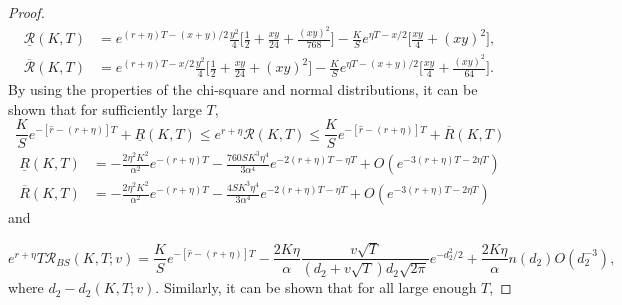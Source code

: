 \documentclass[a4 paper, 12pt]{report}
\theoremstyle{plain}
\begin{document}
\begin{proof}
\begin{align*}
\underline{\mathcal{R}}(K,T)& = e^{(r+\eta)T -(x+y)/2}\frac{y^2}{4}\bigg[\frac{1}{2}+\frac{xy}{24}+\frac{(xy)^2}{768}\bigg] - \frac{K}{S}e^{\eta T - x/2}\bigg[\frac{xy}{4}+(xy)^2\bigg],\\
\overline{\mathcal{R}}(K,T)& = e^{(r+\eta)T -x/2}\frac{y^2}{4}\bigg[\frac{1}{2}+\frac{xy}{24}+(xy)^2\bigg] - \frac{K}{S}e^{\eta T - (x+y)/2}\bigg[\frac{xy}{4}+\frac{(xy)^2}{64}\bigg].
\end{align*}
By using the properties of the chi-square and normal distributions, it can be shown that for
sufficiently large $T$,
\begin{equation}\label{38}
\frac{K}{S}e^{-[\hat{r} - (r+\eta)]T}+\underline{R}(K,T)\leq e^{r+\eta}\mathcal{R}(K,T)\leq \frac{K}{S}e^{-[\hat{r} - (r+\eta)]T}+\overline{R}(K,T)
\end{equation}
\begin{align}
\underline{R}(K,T) &= -\frac{2\eta^2K^2}{\alpha^2}e^{-(r+\eta)T}-\frac{760SK^3\eta^4}{3\alpha^4}e^{-2(r+\eta)T - \eta T}+O(e^{-3(r+\eta)T-2\eta T})\label{39}\\
\overline{R}(K,T) &= -\frac{2\eta^2K^2}{\alpha^2}e^{-(r+\eta)T}-\frac{4SK^3\eta^4}{3\alpha^4}e^{-2(r+\eta)T - \eta T}+O(e^{-3(r+\eta)T-2\eta T})\label{40}
\end{align}
and


\begin{equation}\label{41}
e^{r+\eta}T\mathcal{R}_{BS}(K,T;v) = \frac{K}{S}e^{-[\hat{r} - (r+\eta)]T}  - \frac{2K\eta}{\alpha}\frac{v\sqrt{T}}{(d_2+v\sqrt{T})d_2\sqrt{2\pi}}e^{-d_2^2/2}+\frac{2K\eta}{\alpha}n(d_2)O(d_2^{-3}),
\end{equation}
where $d_2 - d_2(K,T;v)$. Similarly, it can be shown that for all large enough $T$,


\end{proof}
\end{document}
